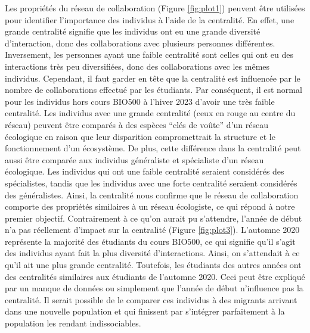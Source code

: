 \documentclass[preprint, 3p,
authoryear]{elsarticle} %
\begin{document}
Les propriétés du réseau de collaboration (Figure \ref{fig:plot1})
peuvent être utilisées pour identifier l'importance des individus à
l'aide de la centralité. En effet, une grande centralité signifie que
les individus ont eu une grande diversité d'interaction, donc des
collaborations avec plusieurs personnes différentes. Inversement, les
personnes ayant une faible centralité sont celles qui ont eu des
interactions très peu diversifiées, donc des collaborations avec les
mêmes individus. Cependant, il faut garder en tête que la centralité est
influencée par le nombre de collaborations effectué par les étudiants.
Par conséquent, il est normal pour les individus hors cours BIO500 à
l'hiver 2023 d'avoir une très faible centralité. Les individus avec une
grande centralité (ceux en rouge au centre du réseau) peuvent être
comparés à des espèces ``clés de voûte'' d'un réseau écologique en
raison que leur disparition compromettrait la structure et le
fonctionnement d'un écosystème. De plus, cette différence dans la
centralité peut aussi être comparée aux individus généraliste et
spécialiste d'un réseau écologique. Les individus qui ont une faible
centralité seraient considérés des spécialistes, tandis que les
individus avec une forte centralité seraient considérés des
généralistes. Ainsi, la centralité nous confirme que le réseau de
collaboration comporte des propriétés similaires à un réseau écologiste,
ce qui répond à notre premier objectif. Contrairement à ce qu'on aurait
pu s'attendre, l'année de début n'a pas réellement d'impact sur la
centralité (Figure \ref{fig:plot3}). L'automne 2020 représente la
majorité des étudiants du cours BIO500, ce qui signifie qu'il s'agit des
individus ayant fait la plus diversité d'interactions. Ainsi, on
s'attendait à ce qu'il ait une plus grande centralité. Toutefois, les
étudiants des autres années ont des centralités similaires aux étudiants
de l'automne 2020. Ceci peut être expliqué par un manque de données ou
simplement que l'année de début n'influence pas la centralité. Il serait
possible de le comparer ces individus à des migrants arrivant dans une
nouvelle population et qui finissent par s'intégrer parfaitement à la
population les rendant indissociables.
\end{document}
